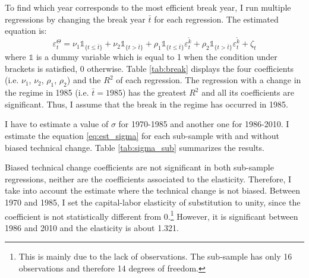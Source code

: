 To find which year corresponds to the most efficient break year, I run multiple regressions by changing the break year $\bar{t}$ for each regression. The estimated equation is:
\begin{equation*}
	\varepsilon_t^{\Theta} = \nu_1 \mathds{1}_{\lbrace t \leq \bar{t} \rbrace} + \nu_2 \mathds{1}_{\lbrace t > \bar{t} \rbrace} + \rho_1 \mathds{1}_{\lbrace t \leq \bar{t} \rbrace} \varepsilon_t^{\tilde{k}} + \rho_2 \mathds{1}_{\lbrace t > \bar{t} \rbrace} \varepsilon_t^{\tilde{k}} + \zeta_t
\end{equation*}
where $\mathds{1}$ is a dummy variable which is equal to 1 when the condition under brackets is satisfied, 0 otherwise. Table \ref{tab:break} displays the four coefficients (i.e. $\nu_1$, $\nu_2$, $\rho_1$, $\rho_2$) and the $R^2$ of each regression. The regression with a change in the regime in 1985 (i.e. $\bar{t} = 1985$) has the greatest $R^2$ and all its coefficients are significant. Thus, I assume that the break in the regime has occurred in 1985.

I have to estimate a value of $\sigma$ for 1970-1985 and another one for 1986-2010. I estimate the equation \eqref{eq:est_sigma} for each sub-sample with and without biased technical change. Table \ref{tab:sigma_sub} summarizes the results. 
	
Biased technical change coefficients are not significant in both sub-sample regressions, neither are the coefficients associated to the elasticity. Therefore, I take into account the estimate where the technical change is not biased. Between 1970 and 1985, I set the capital-labor elasticity of substitution to unity, since the coefficient is not statistically different from 0.\footnote{This is mainly due to the lack of observations. The sub-sample has only 16 observations and therefore 14 degrees of freedom.} However, it is significant between 1986 and 2010 and the elasticity is about 1.321.